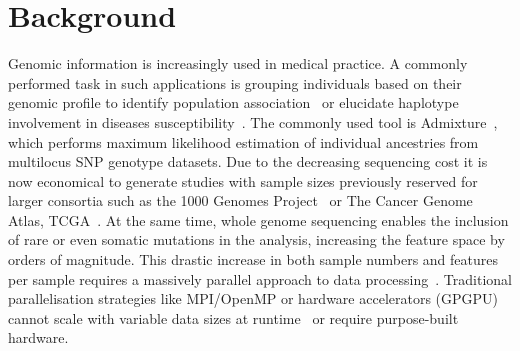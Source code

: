 \documentclass{bmcart}
\begin{document}


\section*{Background}

Genomic information is increasingly used in medical practice.
A commonly performed task in such applications is grouping individuals based on their genomic profile to identify population association~\cite{Gao2007} or elucidate haplotype involvement in diseases susceptibility~\cite{Laitman2013}.
The commonly used tool is {\sc Admixture}~\cite{Alexander2009}, which performs maximum likelihood estimation of individual ancestries from multilocus SNP genotype datasets.
Due to the decreasing sequencing cost it is now economical to generate studies with sample sizes previously reserved for larger consortia such as the 1000 Genomes Project~\cite{1KG2012} or The Cancer Genome Atlas, TCGA~\cite{TCGA2013}. 
At the same time, whole genome sequencing enables the inclusion of rare or even somatic mutations in the analysis, increasing the feature space by orders of magnitude. This drastic increase in both sample numbers and features per sample requires a massively parallel approach to data processing~\cite{Stein2010}. Traditional parallelisation strategies like MPI/OpenMP or hardware accelerators (GPGPU) cannot scale with variable data sizes at runtime~\cite{ReyesOrtiz2015121} or require purpose-built hardware.
 
\end{document}
